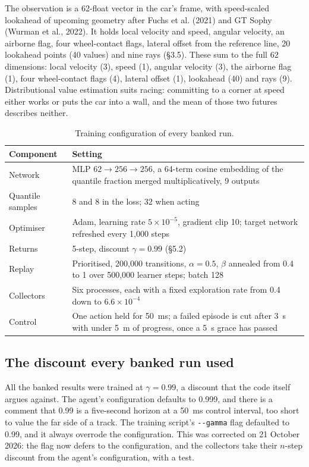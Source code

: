 \documentclass[11pt]{article}
\begin{document}
The observation is a 62-float vector in the car's frame, with speed-scaled lookahead of upcoming geometry after Fuchs et al. (2021) and GT Sophy (Wurman et al., 2022). It holds local velocity and speed, angular velocity, an airborne flag, four wheel-contact flags, lateral offset from the reference line, 20 lookahead points (40 values) and nine rays (\S3.5). These sum to the full 62 dimensions: local velocity (3), speed (1), angular velocity (3), the airborne flag (1), four wheel-contact flags (4), lateral offset (1), lookahead (40) and rays (9). Distributional value estimation suits racing: committing to a corner at speed either works or puts the car into a wall, and the mean of those two futures describes neither.

\begin{table}[h]
\centering
\small
\begin{tabular}{@{}lL{9cm}@{}}
\toprule
\textbf{Component} & \textbf{Setting} \\
\midrule
Network & MLP $62 \rightarrow 256 \rightarrow 256$, a 64-term cosine embedding of the quantile fraction merged multiplicatively, 9 outputs \\
Quantile samples & 8 and 8 in the loss; 32 when acting \\
Optimiser & Adam, learning rate $5 \times 10^{-5}$, gradient clip 10; target network refreshed every 1,000 steps \\
Returns & 5-step, discount $\gamma = 0.99$ (\S5.2) \\
Replay & Prioritised, 200,000 transitions, $\alpha = 0.5$, $\beta$ annealed from 0.4 to 1 over 500,000 learner steps; batch 128 \\
Collectors & Six processes, each with a fixed exploration rate from 0.4 down to $6.6 \times 10^{-4}$ \\
Control & One action held for 50~ms; a failed episode is cut after 3~s with under 5~m of progress, once a 5~s grace has passed \\
\bottomrule
\end{tabular}
\caption{Training configuration of every banked run.}
\label{tab:trainconfig}
\end{table}

\subsection{The discount every banked run used}

All the banked results were trained at $\gamma = 0.99$, a discount that the code itself argues against. The agent's configuration defaults to 0.999, and there is a comment that 0.99 is a five-second horizon at a 50~ms control interval, too short to value the far side of a track. The training script's \texttt{-{}-gamma} flag defaulted to 0.99, and it always overrode the configuration. This was corrected on 21 October 2026: the flag now defers to the configuration, and the collectors take their $n$-step discount from the agent's configuration, with a test.
\end{document}
